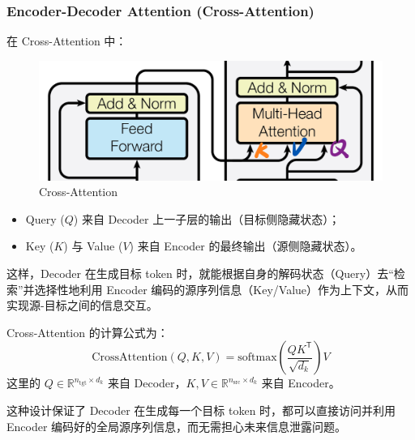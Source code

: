 \subsubsection{Encoder-Decoder Attention (Cross-Attention)}

在 Cross-Attention 中：

\begin{figure}[htbp]
  \centering
  \includegraphics[width=0.6\linewidth]{figs/lec2/lec2.25.jpeg}
  \caption{Cross-Attention}
  \label{fig:Cross-Attention}
\end{figure}

\begin{itemize}
  \item {\color{qpurple}Query ($Q$)} 来自 Decoder 上一子层的输出（目标侧隐藏状态）；
  \item {\color{orange}Key ($K$)} 与 {\color{zblue}Value ($V$)} 来自 Encoder 的最终输出（源侧隐藏状态）。
\end{itemize}
这样，Decoder 在生成目标 token 时，就能根据自身的解码状态（Query）去“检索”并选择性地利用 Encoder 编码的源序列信息（Key/Value）作为上下文，从而实现源-目标之间的信息交互。

Cross-Attention 的计算公式为：
\[
\text{CrossAttention}(Q, K, V) = \text{softmax}\left(\frac{QK^\mathsf{T}}{\sqrt{d_k}}\right)V
\]
这里的 $Q \in \mathbb{R}^{n_{\text{tgt}} \times d_k}$ 来自 Decoder，$K, V \in \mathbb{R}^{n_{\text{src}} \times d_k}$ 来自 Encoder。


这种设计保证了 Decoder 在生成每一个目标 token 时，都可以直接访问并利用 Encoder 编码好的全局源序列信息，而无需担心未来信息泄露问题。

